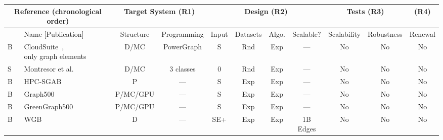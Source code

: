 \begin{tabular}[!tb]{|l|l|l|l|l|l|l|l|l|l|l|}
\hline
\multicolumn{2}{|c|}{Reference (chronological order)} & \multicolumn{2}{c|}{Target System (R1)} & \multicolumn{4}{c|}{Design (R2)} & \multicolumn{2}{c|}{Tests (R3)} & \multicolumn{1}{c|}{(R4)}\\ 
\hline
 & Name [Publication] & \multicolumn{1}{c|}{Structure} & \multicolumn{1}{c|}{Programming} & \multicolumn{1}{c|}{Input} & \multicolumn{1}{c|}{Datasets} & \multicolumn{1}{c|}{Algo.} & \multicolumn{1}{c|}{Scalable?} & \multicolumn{1}{c|}{Scalability} & \multicolumn{1}{c|}{Robustness} & \multicolumn{1}{c|}{Renewal}\\ 
\hline
B & \pbox{5cm}{CloudSuite~\cite{DBLP:conf/asplos/FerdmanAKVAJKPAF12}, \\only graph elements} & \multicolumn{1}{c|}{D/MC} & \multicolumn{1}{c|}{PowerGraph} & \multicolumn{1}{c|}{S} & \multicolumn{1}{c|}{Rnd} & \multicolumn{1}{c|}{Exp} & \multicolumn{1}{c|}{---} & \multicolumn{1}{c|}{No} & \multicolumn{1}{c|}{No} & \multicolumn{1}{c|}{No} \\ 
\hline
S & Montresor et al.~\cite{DBLP:conf/bigdataconf/ElserM13} & \multicolumn{1}{c|}{D/MC} & \multicolumn{1}{c|}{3 classes} & \multicolumn{1}{c|}{0} & \multicolumn{1}{c|}{Rnd} & \multicolumn{1}{c|}{Exp} & \multicolumn{1}{c|}{---} & \multicolumn{1}{c|}{No} & \multicolumn{1}{c|}{No} & \multicolumn{1}{c|}{No} \\ 
\hline
B & HPC-SGAB~\cite{DBLP:conf/hipc/BaderM05} & \multicolumn{1}{c|}{P} & \multicolumn{1}{c|}{---} & \multicolumn{1}{c|}{S} & \multicolumn{1}{c|}{Exp} & \multicolumn{1}{c|}{Exp} & \multicolumn{1}{c|}{---} & \multicolumn{1}{c|}{No} & \multicolumn{1}{c|}{No} & \multicolumn{1}{c|}{No} \\ 
\hline
B & Graph500 & \multicolumn{1}{c|}{P/MC/GPU} & \multicolumn{1}{c|}{---} & \multicolumn{1}{c|}{S} & \multicolumn{1}{c|}{Exp} & \multicolumn{1}{c|}{Exp} & \multicolumn{1}{c|}{---} & \multicolumn{1}{c|}{No} & \multicolumn{1}{c|}{No} & \multicolumn{1}{c|}{No} \\ 
\hline
B & GreenGraph500 & \multicolumn{1}{c|}{P/MC/GPU} & \multicolumn{1}{c|}{---} & \multicolumn{1}{c|}{S} & \multicolumn{1}{c|}{Exp} & \multicolumn{1}{c|}{Exp} & \multicolumn{1}{c|}{---} & \multicolumn{1}{c|}{No} & \multicolumn{1}{c|}{No} & \multicolumn{1}{c|}{No} \\ 
\hline
B & WGB~\cite{DBLP:conf/wbdb/AmmarO13} & \multicolumn{1}{c|}{D} & \multicolumn{1}{c|}{---} & \multicolumn{1}{c|}{SE+} & \multicolumn{1}{c|}{Exp} & \multicolumn{1}{c|}{Exp} & \multicolumn{1}{c|}{1B Edges} & \multicolumn{1}{c|}{No} & \multicolumn{1}{c|}{No} & \multicolumn{1}{c|}{No} \\ 

\end{tabular}
